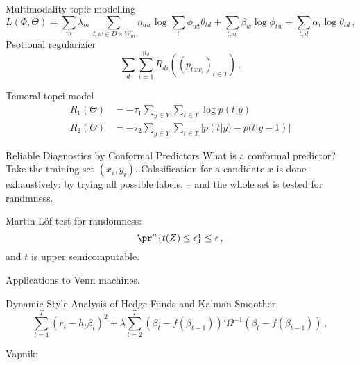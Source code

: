 Multimodality topic modelling
\[ L(\Phi,\Theta)
	= \sum_m \lambda_m \sum_{d,w\in D\times W_m} n_{dw} \log \sum_t \phi_{wt}\theta_{td}
		+ \sum_{t,w}\beta_w \log \phi_{tw}
		+ \sum_{t,d}\alpha_t \log \theta_{td} \,, \]
Psotional regularizier
\[ \sum_d \sum_{i=1}^{n_d} R_{di}( (p_{tdw_i})_{t\in T} ) \,. \]

Temoral topci model
\begin{align*}
	R_1(\Theta) &= -\tau_1\sum_{y\in Y}\sum_{t\in T} \log p(t|y)\\
	R_2(\Theta) &= -\tau_2\sum_{y\in Y}\sum_{t\in T} | p(t|y) - p(t|y-1) |
\end{align*}

Reliable Diagnostics by Conformal Predictors
What is a conformal predictor?
Take the training set $(x_i, y_i)$. Calssification for a candidate $x$ is done
exhaustively: by trying all possible labels, -- and the whole set is tested for
randmness.

Martin L\"of-test for randomness:
\[ \pr^n\{ t(Z) \leq \epsilon \} \leq \epsilon \,, \]
and $t$ is upper semicomputable.

Applications to Venn machines.


Dynamic Style Analysis of Hedge Funds and Kalman Smoother
\[ \sum_{t=1}^T (r_t - h_t\beta_t)^2 + \lambda \sum_{t=2}^T (\beta_t - f(\beta_{t-1}))'\Omega^{-1} (\beta_t - f(\beta_{t-1})) \,, \]


Vapnik:
